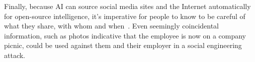 Finally, because AI can source social media sites and the Internet automatically for open-source intelligence, it's imperative for people to know to be careful of what they share, with whom and when~\citep{mitnick_The_Art_of_Deception_2003}. Even seemingly coincidental information, such as photos indicative that the employee is now on a company picnic, could be used against them and their employer in a social engineering attack.

